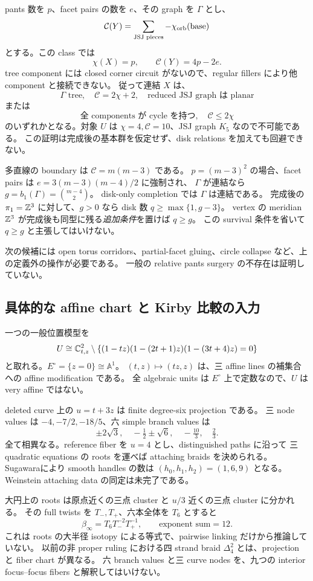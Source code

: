 \documentclass[11pt,a4paper]{article}
\begin{document}
pants 数を $p$、facet pairs の数を $e$、その graph を $\Gamma$ とし、
\[
 \mathcal C(Y)=\sum_{\text{JSJ pieces}}-\chi_{\rm orb}(\text{base})
\]
とする。この class では
\[
 \chi(X)=p,\qquad\mathcal C(Y)=4p-2e.
\]
tree component には closed corner circuit がないので、regular fillers により他 component と接続できない。
従って連結 $X$ は、
\[
 \Gamma\text{ tree},\quad\mathcal C=2\chi+2,
 \quad\text{reduced JSJ graph は planar}
\]
または
\[
 \text{全 components が cycle を持つ},\quad\mathcal C\le2\chi
\]
のいずれかとなる。対象 $U$ は $\chi=4,\mathcal C=10$、JSJ graph $K_5$ なので不可能である。
この証明は完成後の基本群を仮定せず、disk relations を加えても回避できない。

多直線の boundary は $\mathcal C=m(m-3)$ である。
$p=(m-3)^2$ の場合、facet pairs は $e=3(m-3)(m-4)/2$ に強制され、
$\Gamma$ が連結なら $g=b_1(\Gamma)=\binom{m-4}{2}$。
disk-only completion では $\Gamma$ は連結である。
完成後の $\pi_1=\mathbb Z^3$ に対して、$g>0$ なら disk 数 $q\ge\max\{1,g-3\}$。
vertex の meridian $\mathbb Z^3$ が完成後も同型に残る\emph{追加条件}を置けば $q\ge g$。
この survival 条件を省いて $q\ge g$ と主張してはいけない。

次の候補には open torus corridors、partial-facet gluing、circle collapse など、上の定義外の操作が必要である。
一般の relative pants surgery の不存在は証明していない。

\subsection{具体的な affine chart と Kirby 比較の入力}

一つの一般位置模型を
\[
 U\cong\mathbb C^2_{t,z}\setminus
 \{(1-tz)(1-(2t+1)z)(1-(3t+4)z)=0\}
\]
と取れる。$E^\circ=\{z=0\}\cong\mathbb A^1$。
$(t,z)\mapsto(tz,z)$ は、三 affine lines の補集合への affine modification である\cite{KalimanZaidenberg}。
全 algebraic units は $E^\circ$ 上で定数なので、$U$ は very affine ではない。

deleted curve 上の $u=t+3z$ は finite degree-six projection である。
三 node values は $-4,-7/2,-18/5$、六 simple branch values は
\[
 \pm2\sqrt3,\quad-\tfrac12\pm\sqrt6,\quad-\tfrac{10}{3},\quad\tfrac23.
\]
全て相異なる。reference fiber を $u=4$ とし、distinguished paths に沿って
三 quadratic equations の roots を運べば attaching braids を決められる。
Sugawara\cite[Proposition 3.1, Theorems 3.7 and 4.1]{Sugawara}により smooth handles の数は
$(h_0,h_1,h_2)=(1,6,9)$ となる。Weinstein attaching data の同定は未完了である。

大円上の roots は原点近くの三点 cluster と $u/3$ 近くの三点 cluster に分かれる。
その full twists を $T_-,T_+$、六本全体を $T_6$ とすると
\[
 \beta_\infty=T_6T_-^{-2}T_+^{-1},\qquad
 \text{exponent sum}=12.
\]
これは roots の大半径 isotopy による等式で、pairwise linking だけから推論していない。
以前の非 proper ruling における四 strand braid $\Delta_4^2$ とは、projection と fiber chart が異なる。
六 branch values と三 curve nodes を、九つの interior focus--focus fibers と解釈してはいけない。
\end{document}
